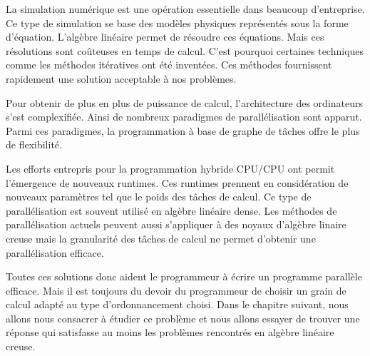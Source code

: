 La simulation numérique est une opération essentielle dans beaucoup d'entreprise.
%
Ce type de simulation se base des modèles physiques représentés sous la forme d'équation.
%
L'algèbre linéaire permet de résoudre ces équations.
%
Mais ces résolutions sont coûteuses en temps de calcul.
%
C'est pourquoi certaines techniques comme les méthodes itératives ont été inventées.
%
Ces méthodes fournissent rapidement une solution acceptable à nos problèmes.


Pour obtenir de plus en plus de puissance de calcul, l'architecture des ordinateurs s'est complexifiée.
%
Ainsi de nombreux paradigmes de parallélisation sont apparut.
%
Parmi ces paradigmes, la programmation à base de graphe de tâches offre le plus de flexibilité.



Les efforts entrepris pour la programmation hybride CPU/CPU ont permit l'émergence de nouveaux runtimes.
%
Ces runtimes prennent en considération de nouveaux paramètres tel que le poids des tâches de calcul.
%
Ce type de parallélisation est souvent utilisé en algèbre linéaire dense.
%
Les méthodes de parallélisation actuels peuvent aussi s'appliquer à des noyaux d'algèbre linaire creuse mais la granularité des tâches de calcul ne permet d'obtenir une parallélisation efficace.




Toutes ces solutions donc aident le programmeur à écrire un programme parallèle efficace.
%
Mais il est toujours du devoir du programmeur de choisir un grain de calcul adapté au type d'ordonnancement choisi.
%
Dans le chapitre suivant, nous allons nous consacrer à étudier ce problème et nous allons essayer de trouver une réponse qui satisfasse au moins les problèmes rencontrés en algèbre linéaire creuse.



